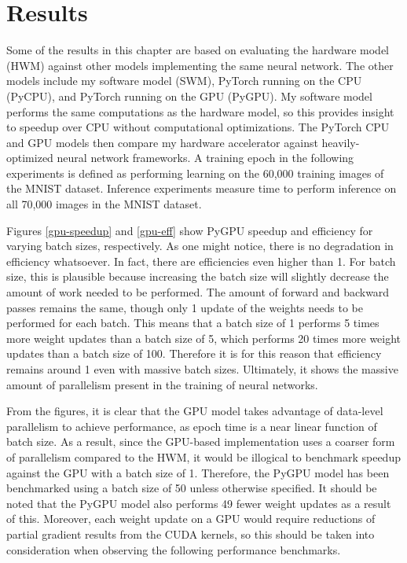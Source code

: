 \chapter{Results}\label{results}
Some of the results in this chapter are based on evaluating the hardware model (HWM) against other models implementing the same neural network. The other models include my software model (SWM), PyTorch running on the CPU (PyCPU), and PyTorch running on the GPU (PyGPU). My software model performs the same computations as the hardware model, so this provides insight to speedup over CPU without computational optimizations. The PyTorch CPU and GPU models then compare my hardware accelerator against heavily-optimized neural network frameworks. A training epoch in the following experiments is defined as performing learning on the 60,000 training images of the MNIST dataset. Inference experiments measure time to perform inference on all 70,000 images in the MNIST dataset.

Figures \ref{gpu-speedup} and \ref{gpu-eff} show PyGPU speedup and efficiency for varying batch sizes, respectively. As one might notice, there is no degradation in efficiency whatsoever. In fact, there are efficiencies even higher than 1. For batch size, this is plausible because increasing the batch size will slightly decrease the amount of work needed to be performed. The amount of forward and backward passes remains the same, though only 1 update of the weights needs to be performed for each batch. This means that a batch size of 1 performs 5 times more weight updates than a batch size of 5, which performs 20 times more weight updates than a batch size of 100. Therefore it is for this reason that efficiency remains around 1 even with massive batch sizes. Ultimately, it shows the massive amount of parallelism present in the training of neural networks. 

From the figures, it is clear that the GPU model takes advantage of data-level parallelism to achieve performance, as epoch time is a near linear function of batch size. As a result, since the GPU-based implementation uses a coarser form of parallelism compared to the HWM, it would be illogical to benchmark speedup against the GPU with a batch size of 1. Therefore, the PyGPU model has been benchmarked using a batch size of 50 unless otherwise specified. It should be noted that the PyGPU model also performs 49 fewer weight updates as a result of this. Moreover, each weight update on a GPU would require reductions of partial gradient results from the CUDA kernels, so this should be taken into consideration when observing the following performance benchmarks.

